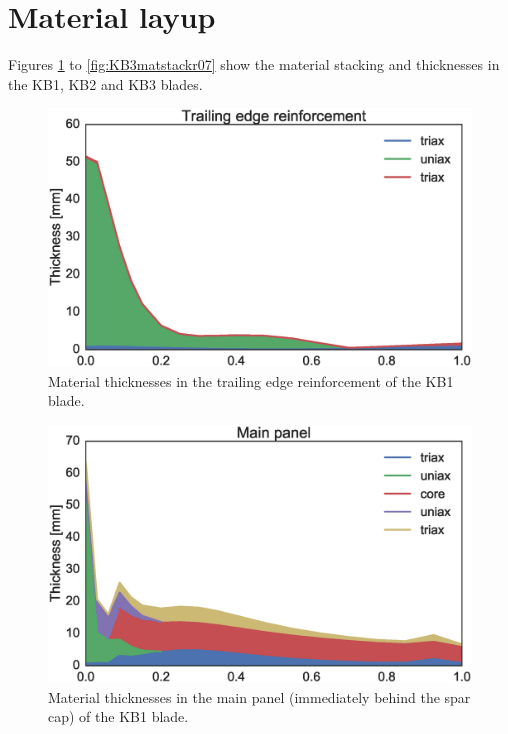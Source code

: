 \section{Material layup}

Figures \ref{fig:KB1matstackr01} to \ref{fig:KB3matstackr07} show the material stacking and thicknesses in the KB1, KB2 and KB3 blades.

\begin{figure}[!ht]
\begin{center}
	\includegraphics[width=.85\linewidth]{figures/KB1_region01.eps}
\end{center}
\caption{Material thicknesses in the trailing edge reinforcement of the KB1 blade.}
\label{fig:KB1matstackr01}
\end{figure}

\begin{figure}[!ht]
\begin{center}
	\includegraphics[width=.85\linewidth]{figures/KB1_region02.eps}
\end{center}
\caption{Material thicknesses in the main panel (immediately behind the spar cap) of the KB1 blade.}
\label{fig:KB1matstackr02}
\end{figure}

